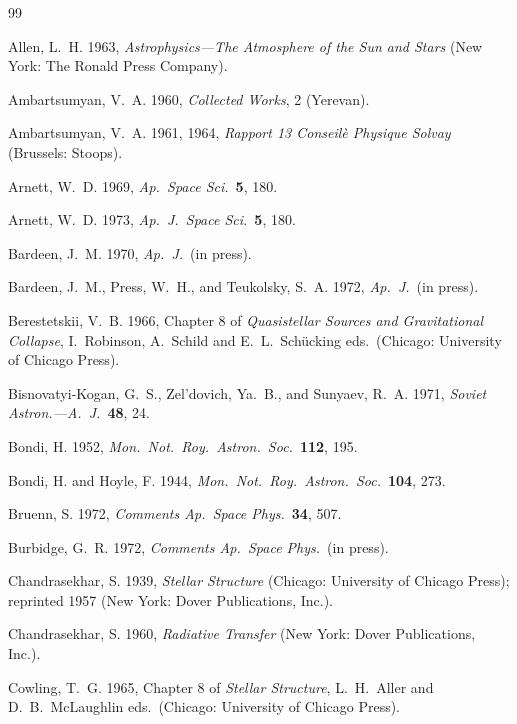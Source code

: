 \begin{thebibliography}{99}

Allen, L.~H. 1963, \textit{Astrophysics---The Atmosphere of the Sun and Stars} (New York:
The Ronald Press Company).

Ambartsumyan, V.~A. 1960, \textit{Collected Works}, 2 (Yerevan).

Ambartsumyan, V.~A. 1961, 1964, \textit{Rapport 13 Conseil\`e Physique Solvay} (Brussels: Stoops).

Arnett, W.~D. 1969, \textit{Ap.\ Space Sci.}\ \textbf{5}, 180.

Arnett, W.~D. 1973, \textit{Ap.\ J.\ Space Sci.}\ \textbf{5}, 180.

Bardeen, J.~M. 1970, \textit{Ap.\ J.}\ (in press).

Bardeen, J.~M., Press, W.~H., and Teukolsky, S.~A. 1972, \textit{Ap.\ J.}\ (in press).

Berestetskii, V.~B. 1966, Chapter 8 of \textit{Quasistellar Sources and
Gravitational Collapse}, I.~Robinson, A.~Schild and E.~L.~Sch\"ucking eds.\ (Chicago:
University of Chicago Press).

Bisnovatyi-Kogan, G.~S., Zel'dovich, Ya.~B., and Sunyaev, R.~A. 1971, \textit{Soviet Astron.---A.~J.}\
\textbf{48}, 24.

Bondi, H. 1952, \textit{Mon.\ Not.\ Roy.\ Astron.\ Soc.}\ \textbf{112}, 195.

Bondi, H. and Hoyle, F. 1944, \textit{Mon.\ Not.\ Roy.\ Astron.\ Soc.}\ \textbf{104}, 273.

Bruenn, S. 1972, \textit{Comments Ap.\ Space Phys.}\ \textbf{34}, 507.

Burbidge, G.~R. 1972, \textit{Comments Ap.\ Space Phys.}\ (in press).

Chandrasekhar, S. 1939, \textit{Stellar Structure} (Chicago: University of Chicago Press);
reprinted 1957 (New York: Dover Publications, Inc.).

Chandrasekhar, S. 1960, \textit{Radiative Transfer} (New York: Dover Publications, Inc.).

Cowling, T.~G. 1965, Chapter 8 of \textit{Stellar Structure},
L.~H.~Aller and D.~B.~McLaughlin eds.\
(Chicago: University of Chicago Press).


\end{thebibliography}
